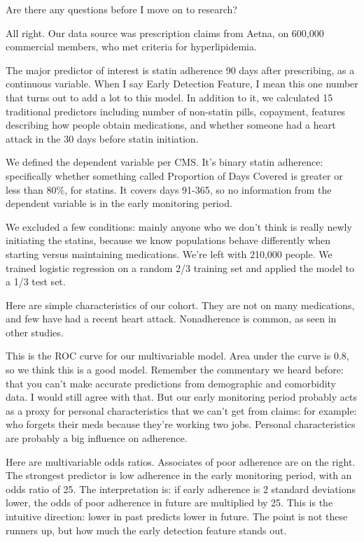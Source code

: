 \documentclass[12pt]{report}
\begin{document}
\begin{large}
Are there any questions before I move on to research?







All right. Our data source was prescription claims from Aetna, on
600,000 commercial members, who met criteria for hyperlipidemia.

The major predictor of interest is statin adherence 90 days after
prescribing, as a continuous variable. When I say Early Detection
Feature, I mean this one number that turns out to add a lot to this
model. In addition to it, we calculated 15 traditional predictors
including number of non-statin pills, copayment, features describing
how people obtain medications, and whether someone had a heart attack
in the 30 days before statin initiation.

We defined the dependent variable per CMS. It's binary statin
adherence: specifically whether something called Proportion of Days
Covered is greater or less than 80\%, for statins. It covers days
91-365, so no information from the dependent variable is in the early
monitoring period.

We excluded a few conditions: mainly anyone who we don't think is
really newly initiating the statins, because we know populations
behave differently when starting versus maintaining medications. We're
left with 210,000 people. We trained logistic regression on a random 2/3 training set and applied the model to a 1/3 test set.

Here are simple characteristics of our cohort. They are not on many
medications, and few have had a recent heart attack. Nonadherence is
common, as seen in other studies.

This is the ROC curve for our multivariable model. Area under the
curve is 0.8, so we think this is a good model. Remember the
commentary we heard before: that you can't make accurate predictions
from demographic and comorbidity data. I would still agree with that.
But our early monitoring period probably acts as a proxy for personal
characteristics that we can't get from claims: for example: who
forgets their meds because they're working two jobs. Personal
characteristics are probably a big influence on adherence.

Here are multivariable odds ratios. Associates of poor adherence are
on the right. The strongest predictor is low adherence in the early
monitoring period, with an odds ratio of 25. The interpretation is: if
early adherence is 2 standard deviations lower, the odds of poor
adherence in future are multiplied by 25. This is the intuitive
direction: lower in past predicts lower in future. The point is not
these runners up, but how much the early detection feature stands out.


\end{large}
\end{document}
